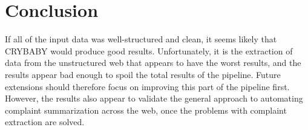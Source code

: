 \documentclass{article}
\begin{document}

\section{Conclusion} %

If all of the input data was well-structured and clean, it seems likely that
CRYBABY would produce good results. Unfortunately, it is the extraction of data
from the unstructured web that appears to have the worst results, and the
results appear bad enough to spoil the total results of the pipeline. Future
extensions should therefore focus on improving this part of the pipeline first.
However, the results also appear to validate the general approach to automating
complaint summarization across the web, once the problems with complaint
extraction are solved.




\end{document}
